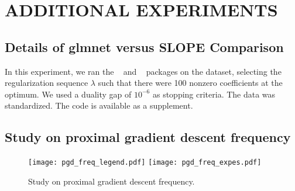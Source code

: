 \section{ADDITIONAL EXPERIMENTS}\label{sec:add_expes}

\subsection{Details of \textsf{glmnet} versus \textsf{SLOPE} Comparison}
\label{sec:slope-vs-glmnet}

In this experiment, we ran the ~\parencite{friedman2022} and ~\parencite{larsson2022d} packages on the  dataset, selecting the regularization sequence \(\lambda\) such that there were 100 nonzero coefficients at the optimum.
We used a duality gap of \(10^{-6}\) as stopping criteria.
The data was standardized.
The code is available as a supplement.

\subsection{Study on proximal gradient descent frequency}

\begin{figure*}[htb]
  \centering
  \texttt{[image: pgd\_freq\_legend.pdf]}
  \texttt{[image: pgd\_freq\_expes.pdf]}
  \caption{Study on proximal gradient descent frequency.}
  \label{fig:pgd_freq}
\end{figure*}
